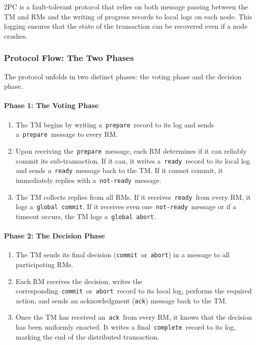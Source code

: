 \documentclass{scrbook}
\begin{document}
2PC is a fault-tolerant protocol that relies on both message passing
between the TM and RMs and the writing of progress records to local logs
on each node. This logging ensures that the state of the transaction can
be recovered even if a node crashes.

\subsubsection{Protocol Flow: The Two Phases}

The protocol unfolds in two distinct phases: the voting phase and the
decision phase.

\paragraph{Phase 1: The Voting Phase}

\begin{enumerate}
\item
  The TM begins by writing a~\texttt{prepare}~record to its log and
  sends a~\texttt{prepare}~message to every RM.
\item
  Upon receiving the~\texttt{prepare}~message, each RM determines if it
  can reliably commit its sub-transaction. If it can, it writes
  a~\texttt{ready}~record to its local log and sends
  a~\texttt{ready}~message back to the TM. If it cannot commit, it
  immediately replies with a~\texttt{not-ready}~message.
\item
  The TM collects replies from all RMs. If it
  receives~\texttt{ready}~from every RM, it logs
  a~\texttt{global\ commit}. If it receives even
  one~\texttt{not-ready}~message or if a timeout occurs, the TM logs
  a~\texttt{global\ abort}.
\end{enumerate}

\paragraph{Phase 2: The Decision Phase}

\begin{enumerate}
\item
  The TM sends its final decision (\texttt{commit}~or~\texttt{abort}) in
  a message to all participating RMs.
\item
  Each RM receives the decision, writes the
  corresponding~\texttt{commit}~or~\texttt{abort}~record to its local
  log, performs the required action, and sends an acknowledgment
  (\texttt{ack}) message back to the TM.
\item
  Once the TM has received an~\texttt{ack}~from every RM, it knows that
  the decision has been uniformly enacted. It writes a
  final~\texttt{complete}~record to its log, marking the end of the
  distributed transaction.
\end{enumerate}
\end{document}
